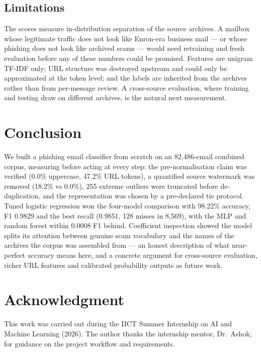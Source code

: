 \documentclass[conference]{IEEEtran}
\begin{document}
\subsection{Limitations}
The scores measure in-distribution separation of the source archives.
A mailbox whose legitimate traffic does not look like Enron-era business
mail --- or whose phishing does not look like archived scams --- would
need retraining and fresh evaluation before any of these numbers could
be promised. Features are unigram TF-IDF only; URL structure was
destroyed upstream and could only be approximated at the token level;
and the labels are inherited from the archives rather than from
per-message review. A cross-source evaluation, where training and
testing draw on different archives, is the natural next measurement.

\section{Conclusion}
We built a phishing email classifier from scratch on an 82{,}486-email
combined corpus, measuring before acting at every step: the
pre-normalisation claim was verified (0.0\% uppercase, 47.2\% URL
tokens), a quantified source watermark was removed (18.2\% vs 0.0\%),
255 extreme outliers were truncated before de-duplication, and the
representation was chosen by a pre-declared tie protocol. Tuned logistic
regression won the four-model comparison with 98.22\% accuracy, F1
0.9829 and the best recall (0.9851, 128 misses in 8{,}569), with the MLP
and random forest within 0.0008 F1 behind. Coefficient inspection showed
the model splits its attention between genuine scam vocabulary and the
names of the archives the corpus was assembled from --- an honest
description of what near-perfect accuracy means here, and a concrete
argument for cross-source evaluation, richer URL features and calibrated
probability outputs as future work.

\section*{Acknowledgment}
This work was carried out during the IICT Summer Internship on AI and
Machine Learning (2026). The author thanks the internship mentor,
Dr.~Ashok, for guidance on the project workflow and requirements.
\end{document}
